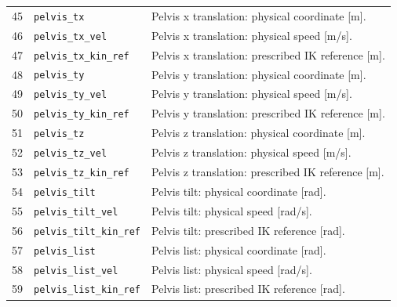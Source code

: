 {\begin{longtable}{@{}r p{7.2cm} p{7.5cm}@{}}
45 & {\fontsize{7.6}{9.2}\selectfont\texttt{pelvis\_\allowbreak{}tx}} & Pelvis x translation: physical coordinate [m].\\
46 & {\fontsize{7.6}{9.2}\selectfont\texttt{pelvis\_\allowbreak{}tx\_\allowbreak{}vel}} & Pelvis x translation: physical speed [m/s].\\
47 & {\fontsize{7.6}{9.2}\selectfont\texttt{pelvis\_\allowbreak{}tx\_\allowbreak{}kin\_\allowbreak{}ref}} & Pelvis x translation: prescribed IK reference [m].\\
48 & {\fontsize{7.6}{9.2}\selectfont\texttt{pelvis\_\allowbreak{}ty}} & Pelvis y translation: physical coordinate [m].\\
49 & {\fontsize{7.6}{9.2}\selectfont\texttt{pelvis\_\allowbreak{}ty\_\allowbreak{}vel}} & Pelvis y translation: physical speed [m/s].\\
50 & {\fontsize{7.6}{9.2}\selectfont\texttt{pelvis\_\allowbreak{}ty\_\allowbreak{}kin\_\allowbreak{}ref}} & Pelvis y translation: prescribed IK reference [m].\\
51 & {\fontsize{7.6}{9.2}\selectfont\texttt{pelvis\_\allowbreak{}tz}} & Pelvis z translation: physical coordinate [m].\\
52 & {\fontsize{7.6}{9.2}\selectfont\texttt{pelvis\_\allowbreak{}tz\_\allowbreak{}vel}} & Pelvis z translation: physical speed [m/s].\\
53 & {\fontsize{7.6}{9.2}\selectfont\texttt{pelvis\_\allowbreak{}tz\_\allowbreak{}kin\_\allowbreak{}ref}} & Pelvis z translation: prescribed IK reference [m].\\
54 & {\fontsize{7.6}{9.2}\selectfont\texttt{pelvis\_\allowbreak{}tilt}} & Pelvis tilt: physical coordinate [rad].\\
55 & {\fontsize{7.6}{9.2}\selectfont\texttt{pelvis\_\allowbreak{}tilt\_\allowbreak{}vel}} & Pelvis tilt: physical speed [rad/s].\\
56 & {\fontsize{7.6}{9.2}\selectfont\texttt{pelvis\_\allowbreak{}tilt\_\allowbreak{}kin\_\allowbreak{}ref}} & Pelvis tilt: prescribed IK reference [rad].\\
57 & {\fontsize{7.6}{9.2}\selectfont\texttt{pelvis\_\allowbreak{}list}} & Pelvis list: physical coordinate [rad].\\
58 & {\fontsize{7.6}{9.2}\selectfont\texttt{pelvis\_\allowbreak{}list\_\allowbreak{}vel}} & Pelvis list: physical speed [rad/s].\\
59 & {\fontsize{7.6}{9.2}\selectfont\texttt{pelvis\_\allowbreak{}list\_\allowbreak{}kin\_\allowbreak{}ref}} & Pelvis list: prescribed IK reference [rad].\\

\end{longtable}}

